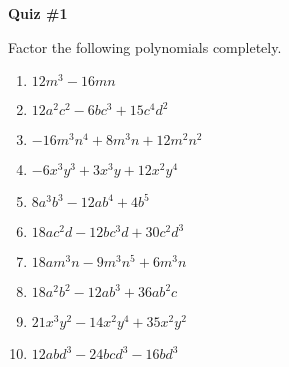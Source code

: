 \begin{center}
\textbf{Quiz \#1}
\end{center} 

\vspce

Factor the following polynomials completely.  
\begin{enumerate}
\item \hspce  $12 m^{3} - 16 m n$
\item \hspce $12 a^{2} c^{2} - 6 b c^{3} + 15 c^{4} d^{2}$
\item \hspce $- 16 m^{3} n^{4} + 8 m^{3} n + 12 m^{2} n^{2}$
\item \hspce $- 6 x^{3} y^{3} + 3 x^{3} y + 12 x^{2} y^{4}$
\item \hspce $8 a^{3} b^{3} - 12 a b^{4} + 4 b^{5}$

\item \hspce $18 a c^{2} d - 12 b c^{3} d + 30 c^{2} d^{3}$

\item \hspce $18 a m^{3} n - 9 m^{3} n^{5} + 6 m^{3} n$


\item \hspce $18 a^{2} b^{2} - 12 a b^{3} + 36 a b^{2} c$

\item \hspce $21 x^{3} y^{2} - 14 x^{2} y^{4} + 35 x^{2} y^{2}$

\item \hspce $12 a b d^{3} - 24 b c d^{3} - 16 b d^{3}$


\end{enumerate}